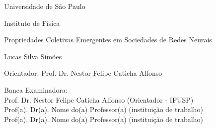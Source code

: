 
\pagestyle{empty}


\begin{center}
{\fontsize{16}{16} \selectfont Universidade de São Paulo \\}

\vspace{0.1cm}

{\fontsize{16}{16} \selectfont Instituto de Física}

\vspace{2.5cm}

\noindent\hrulefill

{\fontsize{22}{22}\selectfont Propriedades Coletivas Emergentes em Sociedades de Redes Neurais \par}

\noindent\hrulefill

\vspace{2cm}

{\fontsize{18}{18}\selectfont Lucas Silva Simões \par}

\vspace{2cm}

\end{center}

\leftskip 4cm

\begin{flushright}
\leftskip 5cm
Orientador: Prof. Dr. Nestor Felipe Caticha Alfonso
\end{flushright}

\vspace{0.5cm}

\par
\leftskip 5cm

\par

\leftskip 0cm

\vskip 1.2cm

\noindent Banca Examinadora: \\
\noindent Prof. Dr. Nestor Felipe Caticha Alfonso (Orientador - IFUSP) \\
Prof(a). Dr(a). Nome do(a) Professor(a) (instituição de trabalho) \\
Prof(a). Dr(a). Nome do(a) Professor(a) (instituição de trabalho) \\
\vspace{1.2cm}

